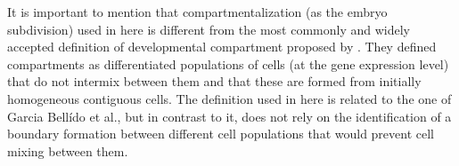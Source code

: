 It is important to mention that compartmentalization (as the embryo subdivision) used in here is different from the most commonly and widely accepted definition of developmental compartment proposed by \citet{Garcia-Bellido1973}.
They defined compartments as differentiated populations of cells (at the gene expression level) that do not intermix between them and that these are formed from initially homogeneous contiguous cells. 
The definition used in here is related to the one of Garcia Bell\'{i}do et al., but in contrast to it, does not rely on the identification of a boundary formation between different cell populations that would prevent cell mixing between them.

%


